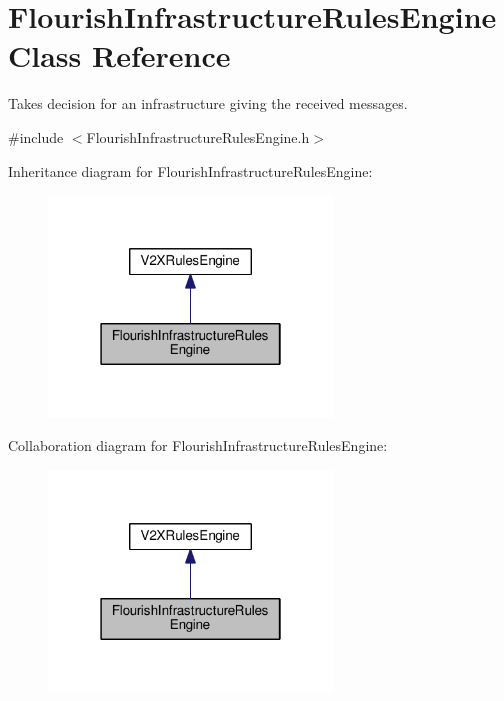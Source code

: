 \hypertarget{classFlourishInfrastructureRulesEngine}{}\section{Flourish\+Infrastructure\+Rules\+Engine Class Reference}
\label{classFlourishInfrastructureRulesEngine}


Takes decision for an infrastructure giving the received messages.  




{\ttfamily \#include $<$Flourish\+Infrastructure\+Rules\+Engine.\+h$>$}



Inheritance diagram for Flourish\+Infrastructure\+Rules\+Engine\+:\nopagebreak
\begin{figure}[H]
\begin{center}
\leavevmode
\includegraphics[width=214pt]{classFlourishInfrastructureRulesEngine__inherit__graph}
\end{center}
\end{figure}


Collaboration diagram for Flourish\+Infrastructure\+Rules\+Engine\+:\nopagebreak
\begin{figure}[H]
\begin{center}
\leavevmode
\includegraphics[width=214pt]{classFlourishInfrastructureRulesEngine__coll__graph}
\end{center}
\end{figure}

